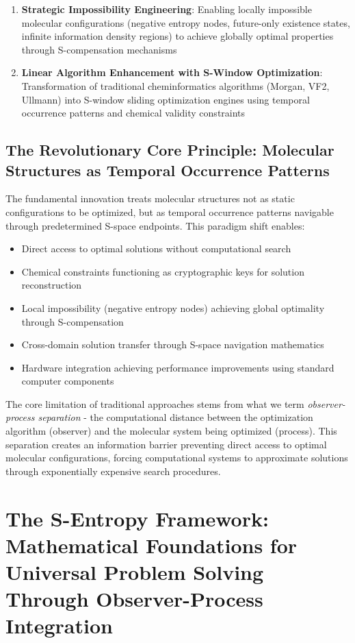 ﻿\documentclass[11pt,a4paper]{article}
\begin{document}
\begin{enumerate}
\item \textbf{Strategic Impossibility Engineering}: Enabling locally impossible molecular configurations (negative entropy nodes, future-only existence states, infinite information density regions) to achieve globally optimal properties through S-compensation mechanisms

\item \textbf{Linear Algorithm Enhancement with S-Window Optimization}: Transformation of traditional cheminformatics algorithms (Morgan, VF2, Ullmann) into S-window sliding optimization engines using temporal occurrence patterns and chemical validity constraints
\end{enumerate}

\subsection{The Revolutionary Core Principle: Molecular Structures as Temporal Occurrence Patterns}

The fundamental innovation treats molecular structures not as static configurations to be optimized, but as temporal occurrence patterns navigable through predetermined S-space endpoints. This paradigm shift enables:

\begin{itemize}
\item Direct access to optimal solutions without computational search
\item Chemical constraints functioning as cryptographic keys for solution reconstruction
\item Local impossibility (negative entropy nodes) achieving global optimality through S-compensation
\item Cross-domain solution transfer through S-space navigation mathematics
\item Hardware integration achieving performance improvements using standard computer components
\end{itemize}

The core limitation of traditional approaches stems from what we term \textit{observer-process separation} - the computational distance between the optimization algorithm (observer) and the molecular system being optimized (process). This separation creates an information barrier preventing direct access to optimal molecular configurations, forcing computational systems to approximate solutions through exponentially expensive search procedures.

\section{The S-Entropy Framework: Mathematical Foundations for Universal Problem Solving Through Observer-Process Integration}
\end{document}
